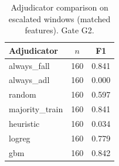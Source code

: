\begin{table}[!t]
\centering
\caption{Adjudicator comparison on escalated windows (matched features). Gate G2.}
\label{tab:adjudicator}
\begin{tabular}{lcc}
\toprule
Adjudicator & $n$ & F1 \\
\midrule
always\_fall & 160 & 0.841 \\
always\_adl & 160 & 0.000 \\
random & 160 & 0.597 \\
majority\_train & 160 & 0.841 \\
heuristic & 160 & 0.034 \\
logreg & 160 & 0.779 \\
gbm & 160 & 0.842 \\
\bottomrule
\end{tabular}
\end{table}
